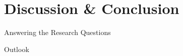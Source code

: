 
\section{Discussion \& Conclusion}

\begin{frame}{Answering the Research Questions}
\end{frame}

\begin{frame}{Outlook}
\end{frame}
